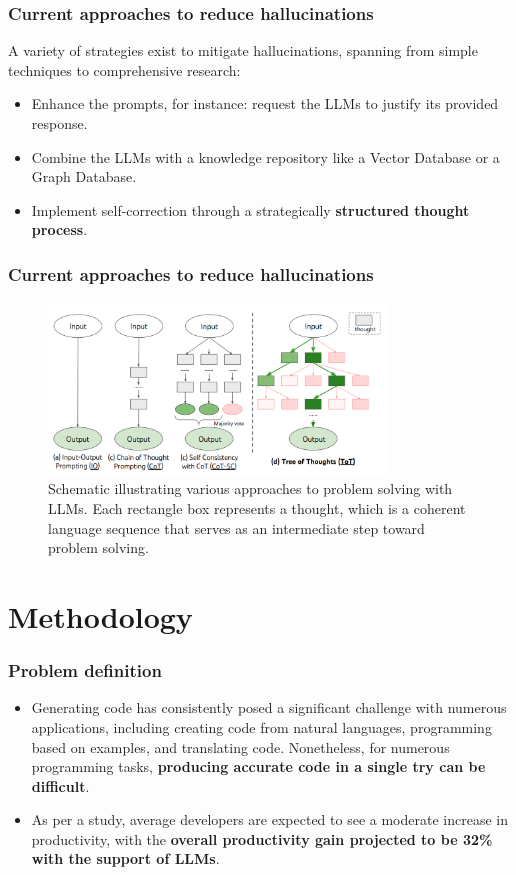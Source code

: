 \documentclass{beamer}
\begin{document}
\begin{frame}[allowframebreaks]
\frametitle{Current approaches to reduce hallucinations}
A variety of strategies exist to mitigate hallucinations, spanning from simple techniques to comprehensive research:
  \begin{itemize}
    \item Enhance the prompts, for instance: request the LLMs to justify its provided response.
    \item Combine the LLMs with a knowledge repository like a Vector Database or a Graph Database.~\cite{yao2023exploring}
    \item Implement self-correction through a strategically \textbf{structured thought process}.~\cite{wei2022chain,yao2023tree}
  \end{itemize}
\end{frame}

\begin{frame}[allowframebreaks]
\frametitle{Current approaches to reduce hallucinations}
  \begin{figure}
    \centering
    \includegraphics[width=0.8\textwidth]{img/chain_of_thoughts.png}
    \caption{Schematic illustrating various approaches to problem solving with LLMs. Each rectangle box represents a thought, which is a coherent language sequence that serves as an intermediate step toward problem solving.~\cite{yao2023tree}}
  \end{figure}
\end{frame}

\section{Methodology}
\begin{frame}[allowframebreaks]
\frametitle{Problem definition}
  \begin{itemize}
    \item Generating code has consistently posed a significant challenge with numerous applications, including creating code from natural languages, programming based on examples, and translating code. Nonetheless, for numerous programming tasks, \textbf{producing accurate code in a single try can be difficult}.~\cite{chen2023teaching}
    \item As per a study, average developers are expected to see a moderate increase in productivity, with the \textbf{overall productivity gain projected to be 32\% with the support of LLMs}.~\cite{eloundou2023gpts}
  \end{itemize}
\end{frame}
\end{document}
